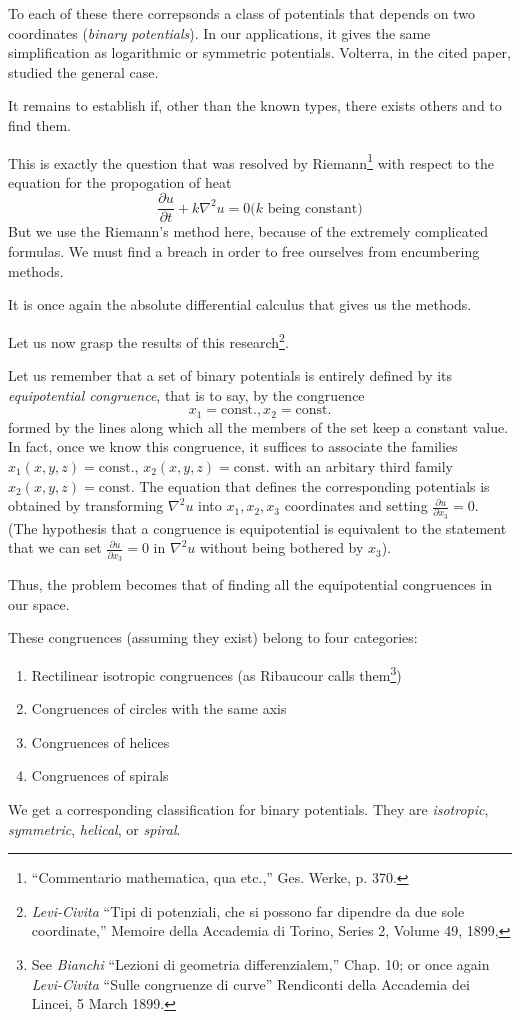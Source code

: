 \documentclass{book}
\begin{document}
To each of these there correpsonds a class of potentials that depends on two coordinates (\emph{binary potentials}). In our applications, it gives the same simplification as logarithmic or symmetric potentials. Volterra, in the cited paper, studied the general case.

It remains to establish if, other than the known types, there exists others and to find them. 

This is exactly the question that was resolved by Riemann\footnote{``Commentario mathematica, qua etc.,'' Ges. Werke, p. 370.} with respect to the equation for the propogation of heat
$$\frac{\partial u}{\partial t}+k\nabla^2u=0 (k\text{ being constant)}$$
But we use the Riemann's method here, because of the extremely complicated formulas. We must find a breach in order to free ourselves from encumbering methods. 

It is once again the absolute differential calculus that gives us the methods. 

Let us now grasp the results of this research\footnote{\emph{Levi-Civita} ``Tipi di potenziali, che si possono far dipendre da due sole coordinate,'' Memoire della Accademia di Torino, Series 2, Volume 49, 1899,}.

Let us remember that a set of binary potentials is entirely defined by its \emph{equipotential congruence}, that is to say, by the congruence
$$x_1=\text{const.}, x_2=\text{const.}$$
formed by the lines along which all the members of the set keep a constant value. In fact, once we know this congruence, it suffices to associate the families $x_1(x,y,z)=\text{const.}$, $x_2(x,y,z)=\text{const.}$ with an arbitary third family $x_2(x,y,z)=\text{const.}$ The equation that defines the corresponding potentials is obtained by transforming $\nabla^2u$ into $x_1,x_2,x_3$ coordinates and setting $\frac{\partial u}{\partial x_3}=0$. (The hypothesis that a congruence is equipotential is equivalent to the statement that we can set $\frac{\partial u}{\partial x_3}=0$ in $\nabla^2u$ without being bothered by $x_3$). 

Thus, the problem becomes that of finding all the equipotential congruences in our space.

These congruences (assuming they exist) belong to four categories:
\begin{enumerate}
	\item Rectilinear isotropic congruences (as Ribaucour calls them\footnote{See \emph{Bianchi} ``Lezioni di geometria differenzialem,'' Chap. 10; or once again \emph{Levi-Civita} ``Sulle congruenze di curve'' Rendiconti della Accademia dei Lincei, 5 March 1899.})
	\item Congruences of circles with the same axis
	\item Congruences of helices
	\item Congruences of spirals
\end{enumerate}
We get a corresponding classification for binary potentials. They are \emph{isotropic}, \emph{symmetric}, \emph{helical}, or \emph{spiral}. 
\end{document}
